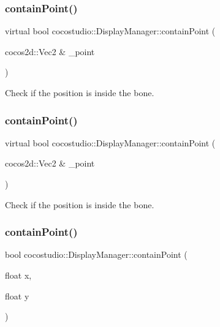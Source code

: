 \subsubsection{\texorpdfstring{contain\+Point()}{containPoint()}\hspace{0.1cm}{\footnotesize\ttfamily [1/4]}}
{\footnotesize\ttfamily virtual bool cocostudio\+::\+Display\+Manager\+::contain\+Point (\begin{DoxyParamCaption}\item[{cocos2d\+::\+Vec2 \&}]{\+\_\+point }\end{DoxyParamCaption})\hspace{0.3cm}{\ttfamily [virtual]}}

Check if the position is inside the bone. \mbox{\label{classcocostudio_1_1DisplayManager_ae29e9c2724c2917efea6b6a584a3d7bd}} 
\subsubsection{\texorpdfstring{contain\+Point()}{containPoint()}\hspace{0.1cm}{\footnotesize\ttfamily [2/4]}}
{\footnotesize\ttfamily virtual bool cocostudio\+::\+Display\+Manager\+::contain\+Point (\begin{DoxyParamCaption}\item[{cocos2d\+::\+Vec2 \&}]{\+\_\+point }\end{DoxyParamCaption})\hspace{0.3cm}{\ttfamily [virtual]}}

Check if the position is inside the bone. \mbox{\label{classcocostudio_1_1DisplayManager_a7c2026aa1027bdce066a883dfc1443db}} 
\subsubsection{\texorpdfstring{contain\+Point()}{containPoint()}\hspace{0.1cm}{\footnotesize\ttfamily [3/4]}}
{\footnotesize\ttfamily bool cocostudio\+::\+Display\+Manager\+::contain\+Point (\begin{DoxyParamCaption}\item[{float}]{x,  }\item[{float}]{y }\end{DoxyParamCaption})\hspace{0.3cm}{\ttfamily [virtual]}}

